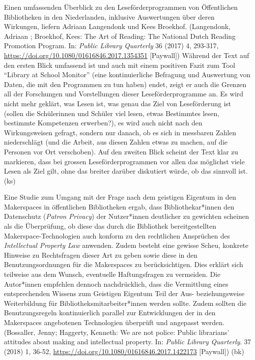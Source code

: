 \documentclass[a4paper,
fontsize=11pt,
oneside,
numbers=noperiodatend,
parskip=half-,
bibliography=totoc,
final
]{scrartcl}
\begin{document}
Einen umfassenden Überblick zu den Leseförderprogrammen von Öffentlichen
Bibliotheken in den Niederlanden, inklusive Auswertungen über deren
Wirkungen, liefern Adriaan Langendonk und Kees Broekhof. (Langendonk,
Adriaan ; Broekhof, Kees: The Art of Reading: The National Dutch Reading
Promotion Program. In: \emph{Public Library Quarterly} 36 (2017) 4,
293-317, \url{https://doi.org/10.1080/01616846.2017.1354351}
{[}Paywall{]}) Während der Text auf den ersten Blick umfassend ist und
auch mit einem positiven Fazit zum Tool \enquote{Library at School
Monitor} (eine kontinuierliche Befragung und Auswertung von Daten, die
mit den Programmen zu tun haben) endet, zeigt er auch die Grenzen all
der Forschungen und Vorstellungen dieser Leseförderprogramme an. Es wird
nicht mehr geklärt, was Lesen ist, was genau das Ziel von Leseförderung
ist (sollen die Schülerinnen und Schüler viel lesen, etwas Bestimmtes
lesen, bestimmte Kompetenzen erwerben?), es wird auch nicht nach den
Wirkungsweisen gefragt, sondern nur danach, ob es sich in messbaren
Zahlen niederschlägt (und die Arbeit, aus diesen Zahlen etwas zu machen,
auf die Personen vor Ort verschoben). Auf den zweiten Blick scheint der
Text klar zu markieren, dass bei grossen Leseförderprogrammen vor allen
das möglichst viele Lesen als Ziel gilt, ohne das breiter darüber
diskutiert würde, ob das sinnvoll ist. (ks)

Eine Studie zum Umgang mit der Frage nach dem geistigen Eigentum in den
Makerspaces in öffentlichen Bibliotheken ergab, dass Bibliothekar*innen
den Datenschutz (\emph{Patron Privacy}) der Nutzer*innen deutlicher zu
gewichten scheinen als die Überprüfung, ob diese das durch die
Bibliothek bereitgestellten Makerspace-Technologien auch konform zu den
rechtlichen Ansprüchen des \emph{Intellectual Property Law} anwenden.
Zudem besteht eine gewisse Scheu, konkrete Hinweise zu Rechtsfragen
dieser Art zu geben sowie diese in den Benutzungsordnungen für die
Makerspaces zu berücksichtigen. Dies erklärt sich teilweise aus dem
Wunsch, eventuelle Haftungsfragen zu vermeiden. Die Autor*innen
empfehlen dennoch nachdrücklich, dass die Vermittlung eines
entsprechenden Wissens zum Geistigen Eigentum Teil der Aus-
beziehungsweise Weiterbildung für Bibliotheksmitarbeiter*innen werden
sollte. Zudem sollten die Benutzungsregeln kontinuierlich parallel zur
Entwicklungen der in den Makerspaces angebotenen Technologien überprüft
und angepasst werden. (Bossaller, Jenny; Haggerty, Kenneth: We are not
police: Public librarians' attitudes about making and intellectual
property. In: \emph{Public Library Quarterly}. 37 (2018) 1, 36-52,
\url{https://doi.org/10.1080/01616846.2017.1422173} {[}Paywall{]}) (bk)
\end{document}
